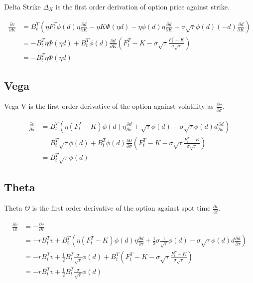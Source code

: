 \documentclass{article}
\begin{document}
Delta Strike $ \Delta_K $ is the first order derivation of option price against strike.

\begin{align} \label{Delta_K Formula}
    \frac{\partial v}{\partial K} &= B_t^T \left(\eta F_t^T \phi(d) \eta \frac{\partial d}{\partial K} - \eta K \Phi(\eta d) - \eta \phi(d) \eta \frac{\partial d}{\partial K} + \sigma \sqrt{\tau} \phi(d) \left(-d\right) \frac{\partial d}{\partial K} \right) \nonumber \\
    &= -B_t^T \eta \Phi(\eta d) + B_t^T \phi(d) \frac{\partial d}{\partial K} \left(F_t^T - K - \sigma \sqrt{\tau} \frac{F_t^T - K}{\sigma \sqrt{\tau}} \right) \nonumber \\
    &= -B_t^T \eta \Phi(\eta d)
\end{align}

\subsection{Vega}

Vega $ \mathrm{V} $ is the first order derivative of the option against volatility as $ \frac{\partial v}{\partial \sigma} $.

\begin{align} \label{Vega Formula}
    \frac{\partial v}{\partial \sigma} &= B_t^T \left(\eta \left(F_t^T - K\right) \phi(d) \eta \frac{\partial d}{\partial \sigma} + \sqrt{\tau} \phi(d) - \sigma \sqrt{\tau} \phi(d) d \frac{\partial d}{\partial \sigma}\right) \nonumber \\
    &= B_t^T \sqrt{\tau} \phi(d) + B_t^T \phi(d) \frac{\partial d}{\partial \sigma}\left(F_t^T - K - \sigma \sqrt{\tau} \frac{F_t^T - K}{\sigma \sqrt{\tau}}\right) \nonumber \\
    &= B_t^T \sqrt{\tau} \phi(d)
\end{align}

\subsection{Theta}

Theta $ \Theta $ is the first order derivative of the option against spot time $ \frac{\partial v}{\partial t} $.

\begin{align} \label{Theta Formula} 
    \frac{\partial v}{\partial t} &= -\frac{\partial v}{\partial \tau} \nonumber \\
    &= -r B_t^T v + B_t^T \left(\eta \left(F_t^T - K\right) \phi(d) \eta \frac{\partial d}{\partial \tau} + \frac{1}{2} \sigma \frac{1}{\sqrt{\tau}} \phi(d) - \sigma \sqrt{\tau} \phi(d) d \frac{\partial d}{\partial \tau}\right) \nonumber \\
    &= -r B_t^T v + \frac{1}{2} B_t^T \frac{\sigma}{\sqrt{\tau}} \phi(d) + B_t^T \left(F_t^T - K - \sigma \sqrt{\tau} \frac{F_t^T - K}{\sigma \sqrt{\tau}}\right) \nonumber \\
    &= -r B_t^T v + \frac{1}{2} B_t^T \frac{\sigma}{\sqrt{\tau}} \phi(d)
\end{align}
\end{document}
